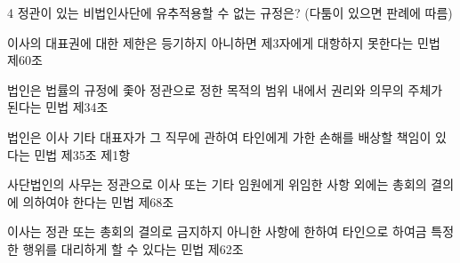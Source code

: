 \begin{question}{4}
정관이 있는 비법인사단에 유추적용할 수 없는 규정은? (다툼이 있으면 판례에 따름)
\begin{choices}
  \item 이사의 대표권에 대한 제한은 등기하지 아니하면 제3자에게 대항하지 못한다는 민법 제60조
  \item 법인은 법률의 규정에 좇아 정관으로 정한 목적의 범위 내에서 권리와 의무의 주체가 된다는 민법 제34조
  \item 법인은 이사 기타 대표자가 그 직무에 관하여 타인에게 가한 손해를 배상할 책임이 있다는 민법 제35조 제1항
  \item 사단법인의 사무는 정관으로 이사 또는 기타 임원에게 위임한 사항 외에는 총회의 결의에 의하여야 한다는 민법 제68조
  \item 이사는 정관 또는 총회의 결의로 금지하지 아니한 사항에 한하여 타인으로 하여금 특정한 행위를 대리하게 할 수 있다는 민법 제62조
\end{choices}
\end{question}
